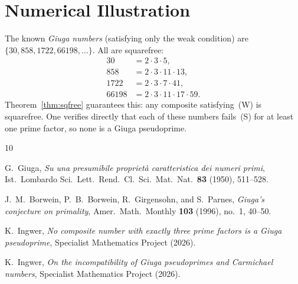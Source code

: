 \documentclass[12pt,a4paper]{amsart}
\theoremstyle{definition}
\begin{document}
\section{Numerical Illustration}

The known \emph{Giuga numbers} (satisfying only the weak condition) are
$\{30, 858, 1722, 66198, \ldots\}$.  All are squarefree:
\begin{align*}
  30 &= 2 \cdot 3 \cdot 5, \\
  858 &= 2 \cdot 3 \cdot 11 \cdot 13, \\
  1722 &= 2 \cdot 3 \cdot 7 \cdot 41, \\
  66198 &= 2 \cdot 3 \cdot 11 \cdot 17 \cdot 59.
\end{align*}
Theorem~\ref{thm:sqfree} guarantees this: any composite satisfying~(W) is squarefree.
One verifies directly that each of these numbers fails~(S) for at least one prime factor,
so none is a Giuga pseudoprime.

\begin{thebibliography}{10}

G.~Giuga,
\emph{Su una presumibile propriet\`a caratteristica dei numeri primi},
Ist.\ Lombardo Sci.\ Lett.\ Rend.\ Cl.\ Sci.\ Mat.\ Nat.\ \textbf{83}
(1950), 511--528.

J.~M.~Borwein, P.~B.~Borwein, R.~Girgensohn, and S.~Parnes,
\emph{Giuga's conjecture on primality},
Amer.\ Math.\ Monthly \textbf{103} (1996), no.\ 1, 40--50.

K.~Ingwer,
\emph{No composite number with exactly three prime factors is a Giuga pseudoprime},
Specialist Mathematics Project (2026).

K.~Ingwer,
\emph{On the incompatibility of Giuga pseudoprimes and Carmichael numbers},
Specialist Mathematics Project (2026).

\end{thebibliography}
\end{document}
